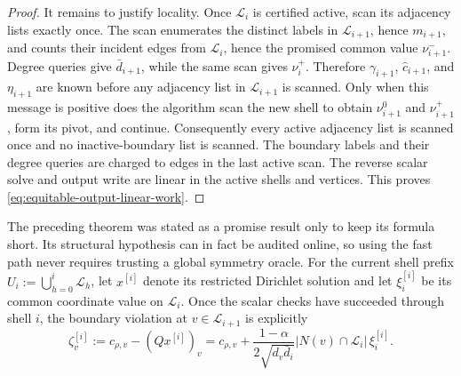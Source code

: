 \begin{proof}
It remains to justify locality.  Once $\mathcal L_i$ is certified active,
scan its adjacency lists exactly once.  The scan enumerates the distinct
labels in $\mathcal L_{i+1}$, hence $m_{i+1}$, and counts their incident edges
from $\mathcal L_i$, hence the promised common value $\nu_{i+1}^-$.  Degree
queries give $\bar d_{i+1}$, while the same scan gives $\nu_i^+$.  Therefore
$\gamma_{i+1}$, $\widehat c_{i+1}$, and $\eta_{i+1}$ are known before any
adjacency list in $\mathcal L_{i+1}$ is scanned.  Only when this message is
positive does the algorithm scan the new shell to obtain $\nu_{i+1}^0$ and
$\nu_{i+1}^+$, form its pivot, and continue.  Consequently every active
adjacency list is scanned once and no inactive-boundary list is scanned.
The boundary labels and their degree queries are charged to edges in the
last active scan.  The reverse scalar solve and output write are linear in
the active shells and vertices.  This proves
\cref{eq:equitable-output-linear-work}.
\end{proof}

The preceding theorem was stated as a promise result only to keep its formula
short.  Its structural hypothesis can in fact be audited online, so using the
fast path never requires trusting a global symmetry oracle.  For the current
shell prefix
$U_i:=\bigcup_{h=0}^i\mathcal L_h$, let $x^{[i]}$ denote its restricted
Dirichlet solution and let $\xi_i^{[i]}$ be its common coordinate value on
$\mathcal L_i$.  Once the scalar checks have succeeded through shell $i$,
the boundary violation at $v\in\mathcal L_{i+1}$ is explicitly
\begin{equation}
 \zeta_v^{[i]}
 :=c_{\rho,v}-(Qx^{[i]})_v
 =c_{\rho,v}
  +\frac{1-\alpha}{2\sqrt{d_v\bar d_i}}
   |N(v)\cap\mathcal L_i|\,\xi_i^{[i]}.
 \label{eq:audited-shell-boundary-violation}
\end{equation}

